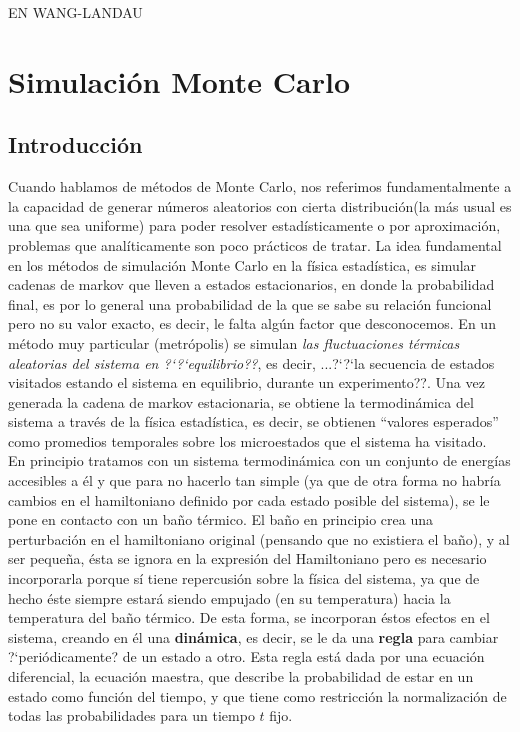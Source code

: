 \documentclass[12pt]{book}
\begin{document}
EN WANG-LANDAU


\chapter{Simulación Monte Carlo}

\section{Introducción}
Cuando hablamos de métodos de Monte Carlo, nos referimos fundamentalmente a la capacidad de generar números aleatorios con cierta distribución(la más usual es una que sea uniforme) para poder resolver estadísticamente o por aproximación, problemas que analíticamente son poco prácticos de tratar. 
La idea fundamental en los métodos de simulación Monte Carlo en la física estadística, es simular cadenas de markov que lleven a estados estacionarios, en donde la probabilidad final, es por lo general una probabilidad de la que se sabe su relación funcional pero no su valor exacto, es decir, le falta algún factor que desconocemos. En un método muy particular (metrópolis) se simulan \textit{las fluctuaciones térmicas aleatorias del sistema en ?`?`equilibrio??}, es decir, ...?`?`la secuencia de estados visitados estando el sistema en equilibrio, durante un experimento??.
Una vez generada la cadena de markov estacionaria, se obtiene la termodinámica del sistema a través de la física estadística, es decir, se obtienen ``valores esperados'' como promedios temporales sobre los microestados que el sistema ha visitado.
\\

En principio tratamos con un sistema termodinámica con un conjunto de energías accesibles a él y que para no hacerlo tan simple (ya que de otra forma no habría cambios en el hamiltoniano definido por cada estado posible del sistema), se le pone en contacto con un baño térmico. El baño en principio crea una perturbación en el hamiltoniano original (pensando que no existiera el baño), y al ser pequeña, ésta se ignora en la expresión del Hamiltoniano pero es necesario incorporarla porque sí tiene repercusión sobre la física del sistema, ya que de hecho éste siempre estará siendo empujado (en su temperatura) hacia la temperatura del baño térmico. De esta forma, se incorporan éstos efectos en el sistema, creando en él una \textbf{dinámica}, es decir, se le da una \textbf{regla} para  cambiar ?`periódicamente? de un estado a otro. Esta regla está dada por una ecuación diferencial, la ecuación maestra, que describe la probabilidad de estar en un estado como función del tiempo, y que tiene como restricción la normalización de todas las probabilidades para un tiempo $t$ fijo.
\end{document}
